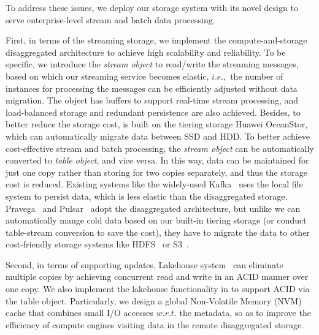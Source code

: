 


To address these issues, we deploy our \sys storage system with its novel design to serve enterprise-level  stream and batch data processing.


First, in terms of the streaming storage, we implement the compute-and-storage disaggregated architecture to achieve high scalability and reliability. To be specific, 
 we introduce the \textit{stream object}  to read/write the streaming messages, based on which our streaming service becomes elastic, $i.e.,$ the number of instances for processing the messages can be efficiently adjusted without data migration. The object has buffers to support real-time stream processing, and load-balanced storage and redundant persistence are also achieved. 
Besides, to better reduce the storage cost,  \sys is built on the tiering storage Huawei OceanStor, which can automatically migrate data between SSD and HDD.
To better achieve cost-effective stream and batch processing, the \textit{stream object}  can be automatically converted  to  \textit{table object}, and vice versa. In this way, data can be maintained for just one copy rather than storing for two copies separately, and thus the storage cost is reduced. 
Existing systems like the widely-used Kafka~\cite{kafka} uses the local file system to persist data, which is less elastic than the disaggregated storage.  Pravega~\cite{pravega} and Pulsar~\cite{pulsa} adopt the disaggregated architecture, but unlike we can automatically mange cold data based on our built-in tiering storage (or conduct table-stream conversion to save the cost), they have to migrate the data to other cost-friendly storage systems like  HDFS~\cite{hdfs} or S3~\cite{s3}.




Second, in terms of supporting updates, Lakehouse system~\cite{iceberg,hudi,delta} can eliminate multiple copies by achieving concurrent read and write in an ACID manner over one copy. We also implement the lakehouse functionality in \sys to support ACID via the table object.
Particularly, we design a global Non-Volatile Memory (NVM) cache that combines small I/O accesses $w.r.t.$ the metadata, so as to improve the efficiency of  compute engines visiting data in the remote disaggregated storage.

